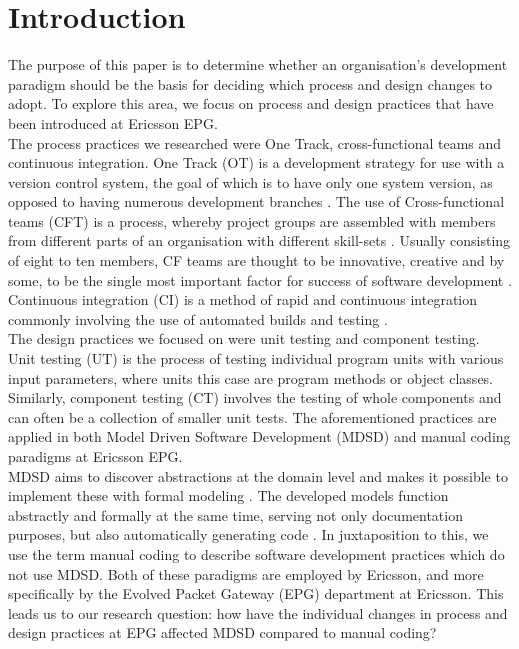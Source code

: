 \documentclass[fina_report_innit.tex]{subfiles}
\begin{document}
\section{Introduction}

The purpose of this paper is to determine whether an organisation's development paradigm should be the basis for deciding which process and design changes to adopt. To explore this area, we focus on process and design practices that have been introduced at Ericsson EPG.
\\

The process practices we researched were One Track, cross-functional teams and continuous integration. One Track (OT) is a development strategy for use with a version control system, the goal of which is to have only one system version, as opposed to having numerous development branches \cite{hribar2008first}. The use of Cross-functional teams (CFT) is a process, whereby project groups are assembled with members from different parts of an organisation with different skill-sets \cite{henke1993perspective}\cite{ghobadi2011challenges}. Usually consisting of eight to ten members, CF teams are thought to be innovative, creative \cite{ghobadi2011challenges} and by some, to be the single most important factor for success of software development \cite{marchwinski2000technical}. Continuous integration (CI) is a method of rapid and continuous integration commonly involving the use of automated builds and testing \cite{sommerville10software}.  
\\

The design practices we focused on were unit testing and component testing. Unit testing (UT) is the process of testing individual program units with various input parameters, where units this case are program methods or object classes. Similarly, component testing (CT) involves the testing of whole components and can often be a collection of smaller unit tests. The aforementioned practices are applied in both Model Driven Software Development (MDSD) and manual coding paradigms at Ericsson EPG.
\\

MDSD aims to discover abstractions at the domain level and makes it possible to implement these with formal modeling \cite{stahl2006model}. The developed models function abstractly and formally at the same time, serving not only documentation purposes, but also automatically generating code \cite{stahl2006model}. In juxtaposition to this, we use the term manual coding to describe software development practices which do not use MDSD. Both of these paradigms are employed by Ericsson, and more specifically by the Evolved Packet Gateway (EPG) department at Ericsson. This leads us to our research question: how have the individual changes in process and design practices at EPG affected MDSD compared to manual coding?
\\
\end{document}
